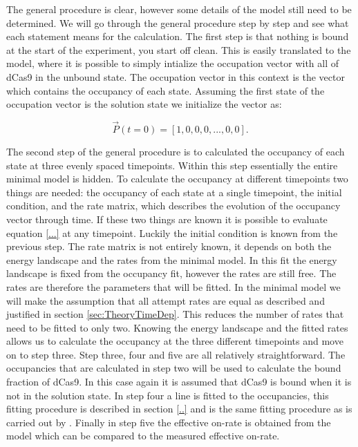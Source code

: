 The general procedure is clear, however some details of the model still need to be determined. We will go through the general procedure step by step and see what each statement means for the calculation. The first step is that nothing is bound at the start of the experiment, you start off clean. This is easily translated to the model, where it is possible to simply intialize the occupation vector with all of dCas9 in the unbound state. The occupation vector in this context is the vector which contains the occupancy of each state. Assuming the first state of the occupation vector is the solution state we initialize the vector as:

\begin{equation}
\vec{P}(t=0) = \left[ 1, 0, 0, 0, ..., 0, 0 \right].
\end{equation}

The second step of the general procedure is to calculated the occupancy of each state at three evenly spaced timepoints. Within this step essentially the entire minimal model is hidden. To calculate the occupancy at different timepoints two things are needed: the occupancy of each state at a single timepoint, the initial condition, and the rate matrix, which describes the evolution of the occupancy vector through time. If these two things are known it is possible to evaluate equation \ref{...} at any timepoint. Luckily the initial condition is known from the previous step. The rate matrix is not entirely known, it depends on both the energy landscape and the rates from the minimal model. In this fit the energy landscape is fixed from the occupancy fit, however the rates are still free. The rates are therefore the parameters that will be fitted. In the minimal model we will make the assumption that all attempt rates are equal as described and justified in section \ref{sec:TheoryTimeDep}. This reduces the number of rates that need to be fitted to only two. Knowing the energy landscape and the fitted rates allows us to calculate the occupancy at the three different timepoints and move on to step three. Step three, four and five are all relatively straightforward. The occupancies that are calculated in step two will be used to calculate the bound fraction of dCas9. In this case again it is assumed that dCas9 is bound when it is not in the solution state. In step four a line is fitted to the occupancies, this fitting procedure is described in section \ref{..} %
and is the same fitting procedure as is carried out by \cite{PNAS}.
Finally in step five the effective on-rate is obtained from the model which can be compared to the measured effective on-rate. 

